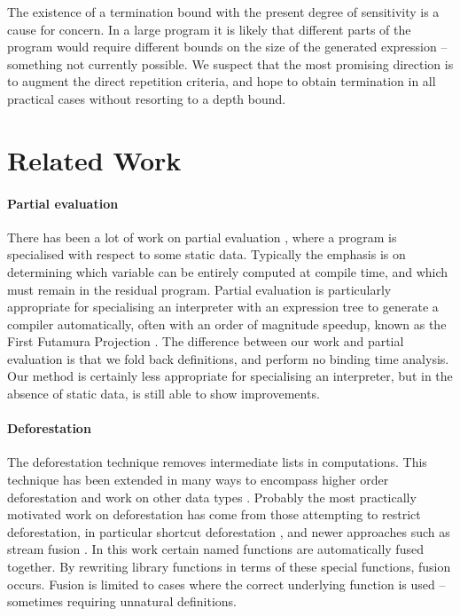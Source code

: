 \documentclass{llncs}
\begin{document}
The existence of a termination bound with the present degree of sensitivity is a cause for concern. In a large program it is likely that different parts of the program would require different bounds on the size of the generated expression -- something not currently possible. We suspect that the most promising direction is to augment the direct repetition criteria, and hope to obtain termination in all practical cases without resorting to a depth bound.

\section{Related Work}
\label{sec:related}

\paragraph{Partial evaluation} There has been a lot of work on partial evaluation \cite{jones:partial_evaluation}, where a program is specialised with respect to some static data. Typically the emphasis is on determining which variable can be entirely computed at compile time, and which must remain in the residual program. Partial evaluation is particularly appropriate for specialising an interpreter with an expression tree to generate a compiler automatically, often with an order of magnitude speedup, known as the First Futamura Projection \cite{futanama:projections}. The difference between our work and partial evaluation is that we fold back definitions, and perform no binding time analysis. Our method is certainly less appropriate for specialising an interpreter, but in the absence of static data, is still able to show improvements.

\paragraph{Deforestation} The deforestation technique \cite{wadler:deforestation} removes intermediate lists in computations. This technique has been extended in many ways to encompass higher order deforestation \cite{marlow:higher_order_deforestation} and work on other data types \cite{coutts:string_fusion}. Probably the most practically motivated work on deforestation has come from those attempting to restrict deforestation, in particular shortcut deforestation \cite{gill:shortcut_deforestation}, and newer approaches such as stream fusion \cite{coutts:stream_fusion}. In this work certain named functions are automatically fused together. By rewriting library functions in terms of these special functions, fusion occurs. Fusion is limited to cases where the correct underlying function is used -- sometimes requiring unnatural definitions.
\end{document}
